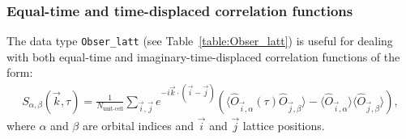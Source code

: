 \subsubsection{Equal-time and time-displaced correlation functions}

The data type \texttt{Obser\_latt} (see Table~\ref{table:Obser_latt}) is useful for dealing with both equal-time and imaginary-time-displaced correlation functions of the form: 
\begin{align}\label{eqn:s}
	S_{\alpha,\beta}(\vec{k},\tau) =   \frac{1}{N_{\text{unit-cell}}} \sum_{\vec{i},\vec{j}}  e^{-i \vec{k} \cdot \left( \vec{i}-\vec{j}\right) } \left( \langle \hat{O}_{\vec{i},\alpha} (\tau) \hat{O}_{\vec{j},\beta} \rangle  - 
	  \langle \hat{O}_{\vec{i},\alpha} \rangle \langle   \hat{O}_{\vec{j},\beta}  \rangle \right),
\end{align}
where $\alpha$ and $\beta$ are orbital indices and $\vec{i}$ and $\vec{j}$ lattice positions.
%
